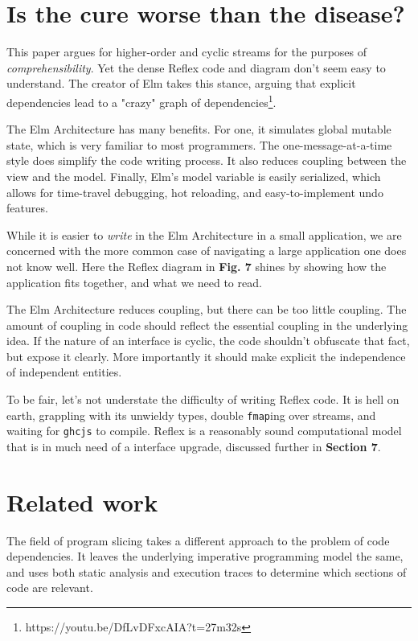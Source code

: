 \documentclass[sigconf]{acmart}
\begin{document}
\section{Is the cure worse than the disease?}

This paper argues for higher-order and cyclic streams for the purposes of \textit{comprehensibility}. Yet the dense Reflex code and diagram don't seem easy to understand. The creator of Elm takes this stance, arguing that explicit dependencies lead to a "crazy" graph of dependencies\footnote{https://youtu.be/DfLvDFxcAIA?t=27m32s}.

The Elm Architecture has many benefits. For one, it simulates global mutable state, which is very familiar to most programmers. The one-message-at-a-time style does simplify the code writing process. It also reduces coupling between the view and the model. Finally, Elm's model variable is easily serialized, which allows for time-travel debugging, hot reloading, and easy-to-implement undo features.

While it is easier to \textit{write} in the Elm Architecture in a small application, we are concerned with the more common case of navigating a large application one does not know well. Here the Reflex diagram in \textbf{Fig. 7} shines by showing how the application fits together, and what we need to read.

The Elm Architecture reduces coupling, but there can be too little coupling. The amount of coupling in code should reflect the essential coupling in the underlying idea. If the nature of an interface is cyclic, the code shouldn't obfuscate that fact, but expose it clearly. More importantly it should make explicit the independence of independent entities.

To be fair, let's not understate the difficulty of writing Reflex code. It is hell on earth, grappling with its unwieldy types, double \lstinline{fmap}ing over streams, and waiting for \lstinline{ghcjs} to compile. Reflex is a reasonably sound computational model that is in much need of a interface upgrade, discussed further in \textbf{Section 7}.

\section{Related work}

The field of program slicing\cite{slicing} takes a different approach to the problem of code dependencies. It leaves the underlying imperative programming model the same, and uses both static analysis and execution traces to determine which sections of code are relevant. 
\end{document}
